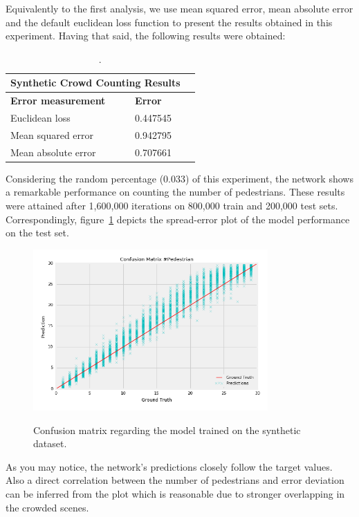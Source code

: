 Equivalently to the first analysis, we use mean squared error, mean absolute error and the default euclidean loss function to present the results obtained in this experiment. Having that said, the following results were obtained:

\begin{table}[H]
\centering
\small\sffamily
\begin{tabular}{llr}
\multicolumn{2}{c}{\textbf{\textbf{Synthetic Crowd Counting Results}}} \\
\bottomrule
\textbf{Error measurement}        & \textbf{Error} \\
\bottomrule
Euclidean loss           & 0.447545  \\
Mean squared error       & 0.942795  \\
Mean absolute error      & 0.707661  \\
\bottomrule
\end{tabular}
\caption{.}
\label{tab:res}
\end{table} 

Considering the random percentage (0.033) of this experiment, the network shows a remarkable performance on counting the number of pedestrians. These results were attained after 1,600,000 iterations on 800,000 train and 200,000 test sets. Correspondingly, figure~\ref{fig:splot} depicts the spread-error plot of the model performance on the test set.

\begin{figure}[H]
	\centering
	{\includegraphics[width=0.8\textwidth]{images/syntheticGraph}}
	\caption{Confusion matrix regarding the model trained on the synthetic dataset.}
	\label{fig:splot}
\end{figure}

As you may notice, the network's predictions closely follow the target values. Also a direct correlation between the number of pedestrians and error deviation can be inferred from the plot which is reasonable due to stronger overlapping in the crowded scenes. 

